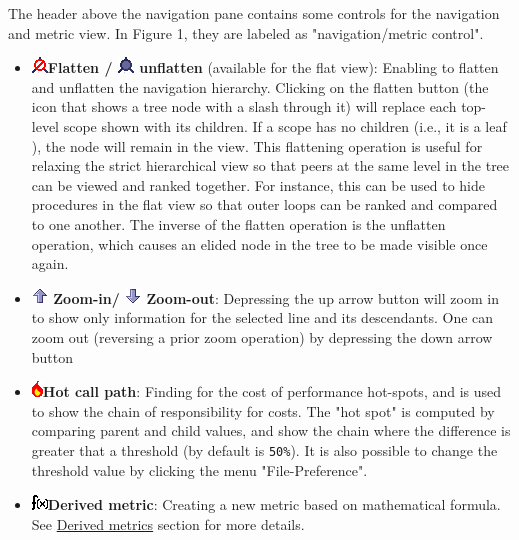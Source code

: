 \documentclass[a4paper,11pt]{article}
\begin{document}
 The header above the navigation pane contains some controls for the  navigation and metric view. In Figure 1, they are labeled as "navigation/metric control".  
\begin{itemize}
	\item 
\includegraphics{images/Flatten.png}\textbf{Flatten / 
\includegraphics{images/Unflatten.png} unflatten} (available for the flat view): Enabling to flatten and unflatten  the navigation hierarchy. Clicking on the flatten button (the icon that  shows a tree node with a slash through it) will replace each top-level  scope shown with its children. If a scope has no children (i.e., it is a  leaf ), the node will remain in the view. This flattening operation is  useful for relaxing the strict hierarchical view so that peers at the same  level in the tree can be viewed and ranked together. For instance, this  can be used to hide procedures in the flat view so that outer loops  can be ranked and compared to one another. The inverse of the flatten  operation is the unflatten operation, which causes an elided node in  the tree to be made visible once again.  
	\item \textbf{
\includegraphics{images/ZoomIn.png} Zoom-in/ 
\includegraphics{images/ZoomOut.png} Zoom-out}: Depressing the up arrow button will zoom in to show only information for the selected line and its descendants. One can zoom out  (reversing a prior zoom operation) by depressing the down arrow button
	\item 
\includegraphics{images/flameIcon.png}\textbf{Hot call path}: Finding for the cost of performance hot-spots, and is used to show the chain of responsibility for costs.  The "hot spot" is computed by comparing parent and child values, and show the chain where the difference is greater that a threshold   (by default is 
\texttt{50\%}). It is also possible to change the threshold value by clicking the menu "File-Preference".
	\item 
\includegraphics{images/FnMetric.png}\textbf{Derived metric}: Creating a new metric based on mathematical formula.   See \hyperlink{derivedmetrics}{Derived metrics} section for more details.

\end{itemize}
\end{document}
